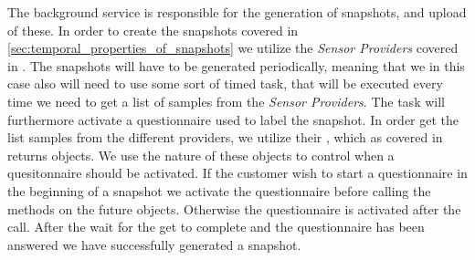 The background service is responsible for the generation of snapshots, and upload of these. In order to create the snapshots covered in \ref{sec:temporal_properties_of_snapshots} we utilize the \emph{Sensor Providers} covered in . The snapshots will have to be generated periodically, meaning that we in this case also will need to use some sort of timed task, that will be executed every time we need to get a list of samples from the \emph{Sensor Providers}. The task will furthermore activate a questionnaire used to label the snapshot. In order get the list samples from the different providers, we utilize their , which as covered in  returns  objects. We use the nature of these objects to control when a quesitonnaire should be activated. If the customer wish to start a questionnaire in the beginning of a snapshot we activate the questionnaire before calling the  methods on the future objects. Otherwise the questionnaire is activated after the call. After the wait for the get to complete and the questionnaire has been answered we have successfully generated a snapshot.

